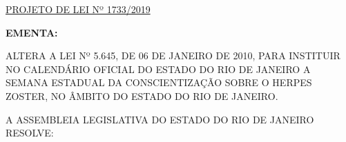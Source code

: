 \documentclass[10pt]{article}
\date{}
\begin{document}
\maketitle
\begin{center}
  \huge
  \vspace{-3cm}\href{http://alerjln1.alerj.rj.gov.br/scpro1923.nsf/f4b46b3cdbba990083256cc900746cf6/1c0416d676b0b0ee032584c60050a7e2?OpenDocument}{PROJETO DE LEI Nº 1733/2019}
\bigskip
\bigskip
\bigskip
  
\end{center}

\textbf{EMENTA:} 

ALTERA A LEI Nº 5.645, DE 06 DE JANEIRO DE 2010, PARA INSTITUIR NO CALENDÁRIO OFICIAL DO ESTADO DO RIO DE JANEIRO A SEMANA ESTADUAL DA CONSCIENTIZAÇÃO SOBRE O HERPES ZOSTER, NO ÂMBITO DO ESTADO DO RIO DE JANEIRO.








\bigskip

\noindent
A ASSEMBLEIA LEGISLATIVA DO ESTADO DO RIO DE JANEIRO RESOLVE:
\end{document}
